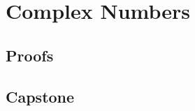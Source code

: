 \chapter{Complex Numbers}
\label{ch:complex-numbers}




\LRAExcludeFromPrintEditionBegin
\section*{Proofs}


\section*{Capstone}

\LRAExcludeFromPrintEditionEnd
